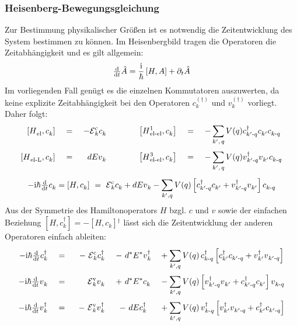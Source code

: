 \documentclass[a4paper,11pt, twoside]{article}
\newcommand{\ind}[2]{{_{#1}^{#2}}}
\newcommand{\+}{\dagger}
\newcommand{\E}{\mathcal{E}}
\newcommand{\dt}[1]{\tfrac{\tt d #1}{\tt d t}}
\renewcommand{\'}{\tt\textquotesingle}
\renewcommand{\^}{\hat}
\renewcommand{\tt}{\text}
\renewcommand{\~}{\widetilde}
\begin{document}
\subsubsection{Heisenberg-Bewegungsgleichung}
Zur Bestimmung physikalischer Größen ist es notwendig die Zeitentwicklung des System bestimmen zu können. Im Heisenbergbild tragen die Operatoren die Zeitabhängigkeit und es gilt allgemein: 
\begin{align*}
\dt{} \^A  = \frac{\tt i}{\hbar}\left [H,A\right ] + \partial_t \^{A}
\end{align*}
Im vorliegenden Fall genügt es die einzelnen Kommutatoren auszuwerten, da keine explizite Zeitabhängigkeit bei den Operatoren $c\ind{k}{(\+)}$ und  $v\ind{k}{(\+)}$ vorliegt. Daher folgt:
\begin{alignat*}{7}
\left [H\ind{\tt{el}}{},c\ind{k}{}\right ]   && \ = \ &&-\E \ind{k}{\tt c} c\ind{k}{} && \qquad &&
 \left [H\ind{\tt{el-el}}{1},c\ind{k}{}\right ]  &&\ =\ && -\sum_{k',\,q} \,&V(q)c\ind{k'\tt -q}{\+}c\ind{k'}{}c\ind{k\tt -q}{} \\
\left [H\ind{\tt{el-L}}{},c\ind{k}{}\right ]  &&\ =\ && dE v\ind{k}{} && \qquad &&
\left [H\ind{\tt{el-el}}{3},c\ind{k}{}\right ]  &&\ =\ && -\sum_{k',\,q}^{}\, &V(q)v\ind{k'\tt-q}{\+}v\ind{k'}{}c\ind{k\tt -q}{}
\end{alignat*} 
\[ 	-\tt i\hbar\dt{} c\ind{k}{}  =  \left [H,c\ind{k}{}\right ] \ = \  \E \ind{k}{\tt c}c\ind{k}{}+dEv\ind{k}{} - \sum_{k',q}^{} V(q)\left [c\ind{k'\tt -q}{\+}c\ind{k'}{}+v\ind{k'\tt-q}{\+}v\ind{k'}{}\right ]c\ind{k\tt -q}{} 		\]
Aus der Symmetrie des Hamiltonoperators $H$ bzgl. $c$ und $v$ sowie der einfachen Beziehung $[H,c\ind{k}{\+}]=-[H,c\ind{k}{}]\ind{}{\+}$ lässt sich die Zeitentwicklung der anderen Operatoren einfach ableiten: 
\begin{alignat*}{5}
-\tt i\hbar\dt{} c\ind{k}{\+}   &&\ =\ && \ - \ \E \ind{k}{\tt c}c\ind{k}{\+} && \ -\  d^*&E^*v\ind{k}{\+} &&+ \sum_{k',q}^{} V(q)\, c\ind{k\tt -q}{\+}\left [c\ind{k'}{\+}c\ind{k'\tt -q}{}+v\ind{k'}{\+}v\ind{k'\tt-q}{}\right ] \\
-\tt i\hbar\dt{} v\ind{k}{}  && \ = \  &&  \E \ind{k}{\tt v}v\ind{k}{}    &&\ +\  d^*&E^* c\ind{k}{}  &&- \sum_{k',q}^{} V(q)\left [v\ind{k'\tt -q}{\+}v\ind{k'}{}+c\ind{k'\tt-q}{\+}c\ind{k'}{}\right ]v\ind{k\tt -q}{} \\ 
-\tt i\hbar\dt{} v\ind{k}{\+}   &&\ =\ && \ -\ \E \ind{k}{\tt v}v\ind{k}{\+} && \ -\ d&Ec\ind{k}{\+} &&+ \sum_{k',q}^{} V(q)\, v\ind{k\tt -q}{\+}\left [v\ind{k'}{\+}v\ind{k'\tt -q}{}+c\ind{k'}{\+}c\ind{k'\tt-q}{}\right ]
\end{alignat*}
\end{document}
